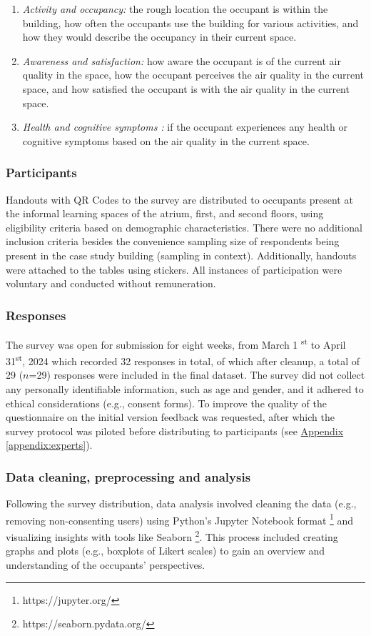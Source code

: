 \begin{enumerate}
  \item \textit{Activity and occupancy:} the rough location the occupant is within the building, how often the occupants use the building for various activities, and how they would describe the occupancy in their current space.
  \item \textit{Awareness and satisfaction:} how aware the occupant is of the current air quality in the space, how the occupant perceives the air quality in the current space, and how satisfied the occupant is with the air quality in the current space.
  \item \textit{Health and cognitive symptoms :} if the occupant experiences any health or cognitive symptoms based on the air quality in the current space.
\end{enumerate}


\subsubsection{Participants}
Handouts with QR Codes to the survey are distributed to occupants present at the informal learning spaces of the atrium, first, and second floors, using eligibility criteria based on demographic characteristics. There were no additional inclusion criteria besides the convenience sampling size of respondents being present in the case study building (sampling in context). Additionally, handouts were attached to the tables using stickers. All instances of participation were voluntary and conducted without remuneration. 

\subsubsection{Responses}
The survey was open for submission for eight weeks, from March 1 \textsuperscript{st} to April 31\textsuperscript{st}, 2024 which recorded 32 responses in total, of which after cleanup, a total of 29 ($n$=29) responses were included in the final dataset. The survey did not collect any personally identifiable information, such as age and gender, and it adhered to ethical considerations (e.g., consent forms). To improve the quality of the questionnaire on the initial version feedback was requested, after which the survey protocol was piloted before
distributing to participants (see \hyperref[appendix:experts]{Appendix \ref*{appendix:experts}}). 

\subsubsection{Data cleaning, preprocessing and analysis}
\label{sec:analysis}
Following the survey distribution, data analysis involved cleaning the data (e.g., removing non-consenting users) using Python's  Jupyter Notebook format \footnote{https://jupyter.org/} and visualizing insights with tools like Seaborn \footnote{https://seaborn.pydata.org/}.  This process included creating graphs and plots (e.g., boxplots of Likert scales) to gain an overview and understanding of the occupants' perspectives.

